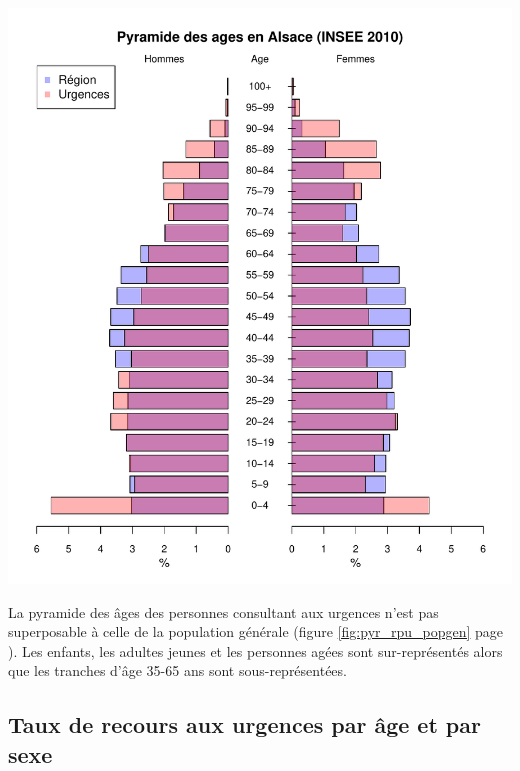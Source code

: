 \documentclass[12pt,english,french,twoside]{book}\usepackage[]{graphicx}\usepackage[]{color}
\makeatletter
\def\maxwidth{ %
  \ifdim\Gin@nat@width>\linewidth
    \linewidth
  \else
    \Gin@nat@width
  \fi
}
\newenvironment{knitrout}{}{} %
\makeatother
\begin{document}
\begin{center}
\begin{knitrout}
\color{fgcolor}
\includegraphics[width=\maxwidth]{figure/comp_pyramides-1} 

\end{knitrout}
\label{fig:pyr_rpu_popgen}
\end{center}


La pyramide des âges des personnes consultant aux urgences n'est pas superposable à celle de la population générale (figure \ref{fig:pyr_rpu_popgen} page \pageref{fig:pyr_rpu_popgen}). Les enfants, les adultes jeunes et les personnes agées sont sur-représentés alors que les tranches d'âge 35-65 ans sont sous-représentées.


\subsection*{Taux de recours aux urgences par âge et par sexe}
\end{document}
